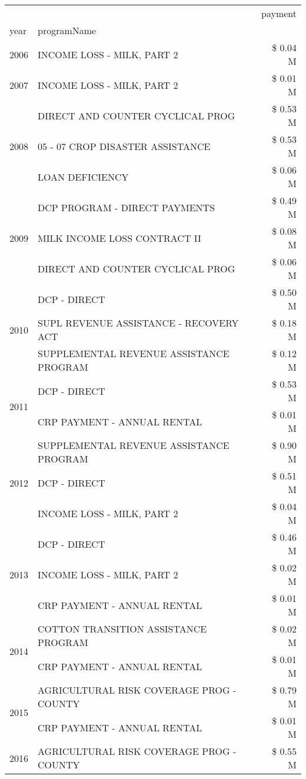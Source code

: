 \begin{tabular}{llr}
\toprule
 &  & payment \\
year & programName &  \\
\midrule
2006 & INCOME LOSS - MILK, PART 2 & \$ 0.04 M \\
\cline{1-3}
2007 & INCOME LOSS - MILK, PART 2 & \$ 0.01 M \\
\cline{1-3}
\multirow[t]{3}{*}{2008} & DIRECT AND COUNTER CYCLICAL PROG & \$ 0.53 M \\
 & 05 - 07 CROP DISASTER ASSISTANCE & \$ 0.53 M \\
 & LOAN DEFICIENCY & \$ 0.06 M \\
\cline{1-3}
\multirow[t]{3}{*}{2009} & DCP PROGRAM - DIRECT PAYMENTS & \$ 0.49 M \\
 & MILK INCOME LOSS CONTRACT II & \$ 0.08 M \\
 & DIRECT AND COUNTER CYCLICAL PROG & \$ 0.06 M \\
\cline{1-3}
\multirow[t]{3}{*}{2010} & DCP - DIRECT & \$ 0.50 M \\
 & SUPL REVENUE ASSISTANCE - RECOVERY ACT & \$ 0.18 M \\
 & SUPPLEMENTAL REVENUE ASSISTANCE PROGRAM & \$ 0.12 M \\
\cline{1-3}
\multirow[t]{2}{*}{2011} & DCP - DIRECT & \$ 0.53 M \\
 & CRP PAYMENT - ANNUAL RENTAL & \$ 0.01 M \\
\cline{1-3}
\multirow[t]{3}{*}{2012} & SUPPLEMENTAL REVENUE ASSISTANCE PROGRAM & \$ 0.90 M \\
 & DCP - DIRECT & \$ 0.51 M \\
 & INCOME LOSS - MILK, PART 2 & \$ 0.04 M \\
\cline{1-3}
\multirow[t]{3}{*}{2013} & DCP - DIRECT & \$ 0.46 M \\
 & INCOME LOSS - MILK, PART 2 & \$ 0.02 M \\
 & CRP PAYMENT - ANNUAL RENTAL & \$ 0.01 M \\
\cline{1-3}
\multirow[t]{2}{*}{2014} & COTTON TRANSITION ASSISTANCE PROGRAM & \$ 0.02 M \\
 & CRP PAYMENT - ANNUAL RENTAL & \$ 0.01 M \\
\cline{1-3}
\multirow[t]{2}{*}{2015} & AGRICULTURAL RISK COVERAGE PROG - COUNTY & \$ 0.79 M \\
 & CRP PAYMENT - ANNUAL RENTAL & \$ 0.01 M \\
\cline{1-3}
\multirow[t]{3}{*}{2016} & AGRICULTURAL RISK COVERAGE PROG - COUNTY & \$ 0.55 M \\

\end{tabular}

